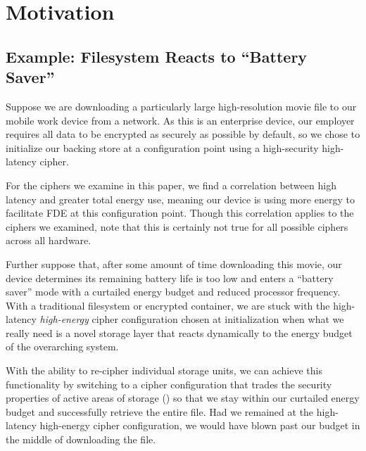 \section{Motivation}\label{sec:motivation}

\subsection{Example: Filesystem Reacts to ``Battery Saver''}


Suppose we are downloading a particularly large high-resolution movie file to
our mobile work device from a network. As this is an enterprise device, our
employer requires all data to be encrypted as securely as possible by default,
so we chose to initialize our backing store at a configuration point using a
high-security high-latency cipher.

For the ciphers we examine in this paper, we find a correlation between high
latency and greater total energy use, meaning our device is using more
energy to facilitate FDE at this configuration point. Though this correlation
applies to the ciphers we examined, note that this is certainly not true for all
possible ciphers across all hardware.

Further suppose that, after some amount of time downloading this movie, our
device determines its remaining battery life is too low and enters a ``battery
saver'' mode with a curtailed energy budget and reduced processor frequency.
With a traditional filesystem or encrypted container, we are stuck with the
high-latency \emph{high-energy} cipher configuration chosen at initialization
when what we really need is a novel storage layer that reacts dynamically to the
energy budget of the overarching system.

With the ability to re-cipher individual storage units, we can achieve this
functionality by switching to a cipher configuration that trades the security
properties of active areas of storage () so that we stay within our
curtailed energy budget and successfully retrieve the entire file. Had we
remained at the high-latency high-energy cipher configuration, we would have
blown past our budget in the middle of downloading the file.

